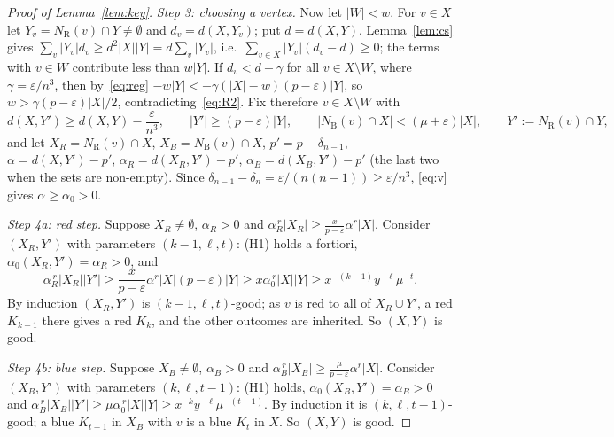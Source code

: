 \documentclass[11pt]{article}
\theoremstyle{definition}
\newcommand{\NR}{N_{\mathrm R}}
\newcommand{\NB}{N_{\mathrm B}}
\newcommand{\eps}{\varepsilon}
\begin{document}
\begin{proof}[Proof of Lemma~\ref{lem:key}]
\smallskip\noindent\emph{Step 3: choosing a vertex.}
Now let $|W|<w$.  For $v\in X$ let $Y_v=\NR(v)\cap Y\neq\emptyset$ and $d_v=d(X,Y_v)$; put $d=d(X,Y)$.  Lemma~\ref{lem:cs} gives $\sum_v|Y_v|d_v\ge d^2|X||Y|=d\sum_v|Y_v|$, i.e.\ $\sum_{v\in X}|Y_v|(d_v-d)\ge0$; the terms with $v\in W$ contribute less than $w|Y|$.  If $d_v<d-\gamma$ for all $v\in X\setminus W$, where $\gamma=\eps/n^3$, then by~\eqref{eq:reg}
$-w|Y|<-\gamma(|X|-w)(p-\eps)|Y|$, so $w>\gamma(p-\eps)|X|/2$, contradicting~\eqref{eq:R2}.  Fix therefore $v\in X\setminus W$ with
\begin{equation}\label{eq:v}
d(X,Y')\ge d(X,Y)-\frac\eps{n^3},\qquad|Y'|\ge(p-\eps)|Y|,\qquad|\NB(v)\cap X|<(\mu+\eps)|X|,\qquad Y':=\NR(v)\cap Y,
\end{equation}
and let $X_R=\NR(v)\cap X$, $X_B=\NB(v)\cap X$, $p'=p-\delta_{n-1}$, $\alpha=d(X,Y')-p'$, $\alpha_R=d(X_R,Y')-p'$, $\alpha_B=d(X_B,Y')-p'$ (the last two when the sets are non-empty).  Since $\delta_{n-1}-\delta_n=\eps/(n(n-1))\ge\eps/n^3$, \eqref{eq:v} gives $\alpha\ge\alpha_0>0$.

\smallskip\noindent\emph{Step 4a: red step.}  Suppose $X_R\ne\emptyset$, $\alpha_R>0$ and $\alpha_R^{\,r}|X_R|\ge\frac x{p-\eps}\alpha^r|X|$.  Consider $(X_R,Y')$ with parameters $(k-1,\ell,t)$: (H1) holds a fortiori, $\alpha_0(X_R,Y')=\alpha_R>0$, and
\[
\alpha_R^{\,r}|X_R||Y'|\ge\frac x{p-\eps}\alpha^r|X|(p-\eps)|Y|\ge x\alpha_0^{\,r}|X||Y|\ge x^{-(k-1)}y^{-\ell}\mu^{-t} .
\]
By induction $(X_R,Y')$ is $(k-1,\ell,t)$-good; as $v$ is red to all of $X_R\cup Y'$, a red $K_{k-1}$ there gives a red $K_k$, and the other outcomes are inherited.  So $(X,Y)$ is good.

\smallskip\noindent\emph{Step 4b: blue step.}  Suppose $X_B\ne\emptyset$, $\alpha_B>0$ and $\alpha_B^{\,r}|X_B|\ge\frac\mu{p-\eps}\alpha^r|X|$.  Consider $(X_B,Y')$ with parameters $(k,\ell,t-1)$: (H1) holds, $\alpha_0(X_B,Y')=\alpha_B>0$ and
$\alpha_B^{\,r}|X_B||Y'|\ge\mu\alpha_0^{\,r}|X||Y|\ge x^{-k}y^{-\ell}\mu^{-(t-1)}$.  By induction it is $(k,\ell,t-1)$-good; a blue $K_{t-1}$ in $X_B$ with $v$ is a blue $K_t$ in $X$.  So $(X,Y)$ is good.


\end{proof}
\end{document}
